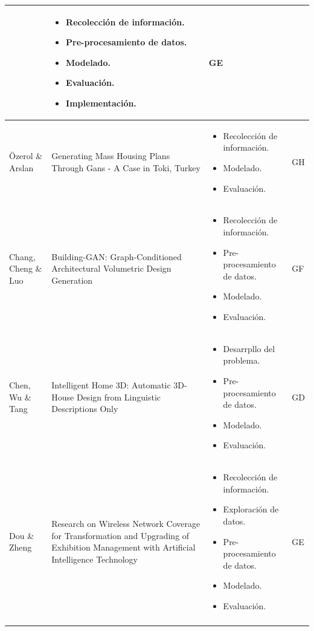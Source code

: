\begin{longtable}{M{3cm}M{5.5cm}M{5.5cm}M{1.5cm}}
			& 
			\begin{itemize}[label={--},nosep,noitemsep,leftmargin=*,topsep=0pt,partopsep=0pt]
				\item Recolección de información.
				\item Pre-procesamiento de datos.
				\item Modelado.
				\item Evaluación.
				\item Implementación.
			\end{itemize}
			& GE
			\\
			\hline
			Özerol \& Arslan
			& Generating Mass Housing Plans Through Gans - A Case in Toki, Turkey
			& 
			\begin{itemize}[label={--},nosep,noitemsep,leftmargin=*,topsep=0pt,partopsep=0pt]
				\item Recolección de información.
				\item Modelado.
				\item Evaluación.
			\end{itemize}
			& GH
			\\
			\hline
			Chang, Cheng \& Luo
			& Building-GAN: Graph-Conditioned Architectural Volumetric Design Generation
			& 
			\begin{itemize}[label={--},nosep,noitemsep,leftmargin=*,topsep=0pt,partopsep=0pt]
				\item Recolección de información.
				\item Pre-procesamiento de datos.
				\item Modelado.
				\item Evaluación.
			\end{itemize}
			& GF
			\\
			\hline
			Chen, Wu \& Tang
			& Intelligent Home 3D: Automatic 3D-House Design from Linguistic Descriptions Only
			& 
			\begin{itemize}[label={--},nosep,noitemsep,leftmargin=*,topsep=0pt,partopsep=0pt]
				\item Desarrpllo del problema.
				\item Pre-procesamiento de datos.
				\item Modelado.
				\item Evaluación.
			\end{itemize}
			& GD
			\\
			\hline
			Dou \& Zheng
			& Research on Wireless Network Coverage for Transformation and Upgrading of Exhibition Management with Artificial Intelligence Technology
			& 
			\begin{itemize}[label={--},nosep,noitemsep,leftmargin=*,topsep=0pt,partopsep=0pt]
				\item Recolección de información.
				\item Exploración de datos.
				\item Pre-procesamiento de datos.
				\item Modelado.
				\item Evaluación.
			\end{itemize}
			& GE
			\\
			\specialrule{.1em}{.05em}{.05em}
		\end{longtable}%
